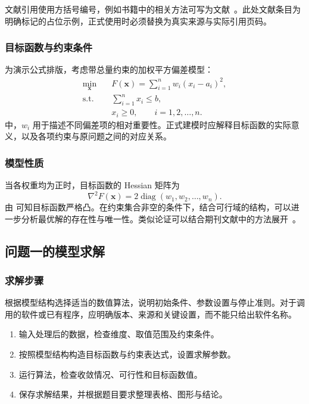 \documentclass{gmcmthesis}
\begin{document}
文献引用使用方括号编号，例如书籍中的相关方法可写为文献~\cite[第10--20页]{demo-book}。此处文献条目为明确标记的占位示例，正式使用时必须替换为真实来源与实际引用页码。

\subsubsection{目标函数与约束条件}
为演示公式排版，考虑带总量约束的加权平方偏差模型：
\begin{equation}
  \begin{aligned}
    \min_{\bm{x}}\quad
      &F(\bm{x})=\sum_{i=1}^{n}w_i(x_i-a_i)^2,\\
    \text{s.t.}\quad
      &\sum_{i=1}^{n}x_i\le b,\\
      &x_i\ge 0,\qquad i=1,2,\ldots,n.
  \end{aligned}
  \label{eq:model}
\end{equation}
 中，$w_i$ 用于描述不同偏差项的相对重要性。正式建模时应解释目标函数的实际意义，以及各项约束与原问题之间的对应关系。

\subsubsection{模型性质}
当各权重均为正时，目标函数的 Hessian 矩阵为
\begin{equation}
  \nabla^2F(\bm{x})
  =2\operatorname{diag}(w_1,w_2,\ldots,w_n).
  \label{eq:hessian}
\end{equation}
由 可知目标函数严格凸。在约束集合非空的条件下，结合可行域的结构，可以进一步分析最优解的存在性与唯一性。类似论证可以结合期刊文献中的方法展开~\cite{demo-article}。

\subsection{问题一的模型求解}

\subsubsection{求解步骤}
根据模型结构选择适当的数值算法，说明初始条件、参数设置与停止准则。对于调用的软件或已有程序，应明确版本、来源和关键设置，而不能只给出软件名称。

\begin{enumerate}
  \item 输入处理后的数据，检查维度、取值范围及约束条件。
  \item 按照模型结构构造目标函数与约束表达式，设置求解参数。
  \item 运行算法，检查收敛情况、可行性和目标函数值。
  \item 保存求解结果，并根据题目要求整理表格、图形与结论。
\end{enumerate}
\end{document}
